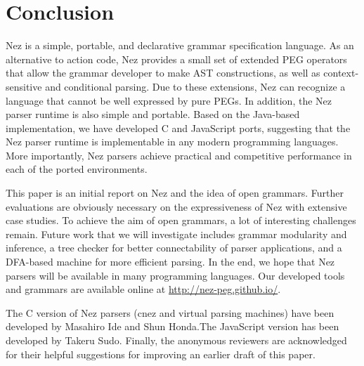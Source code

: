 \documentclass[preprint]{sigplanconf}
\begin{document}
\section{Conclusion} \label{sec:conclusion}

Nez is a simple, portable, and declarative grammar specification language. As an alternative to action code, Nez provides a small set of extended PEG operators that allow the grammar developer to make AST constructions, as well as context-sensitive and conditional parsing. Due to these extensions, Nez can recognize a language that cannot be well expressed by pure PEGs. In addition, the Nez parser runtime is also simple and portable. Based on the Java-based implementation, we have developed C and JavaScript ports, suggesting that the Nez parser runtime is implementable in any modern programming languages. More importantly, Nez parsers achieve practical and competitive performance in each of the ported environments.

This paper is an initial report on Nez and the idea of open grammars. Further evaluations are obviously necessary on the expressiveness of Nez with extensive case studies. To achieve the aim of open grammars, a lot of interesting challenges remain. Future work that we will investigate includes grammar modularity and inference, a tree checker for better connectability of parser applications, and a DFA-based  machine for more efficient parsing. In the end, we hope that Nez parsers will be available in many programming languages. Our developed tools and grammars are available online at \url{http://nez-peg.github.io/}. 
   
\acks
The C version of Nez parsers (cnez and virtual parsing machines) have been developed by Masahiro Ide and Shun Honda.The JavaScript version has been developed by Takeru Sudo. Finally, the anonymous reviewers are acknowledged for their helpful suggestions for improving an earlier draft of this paper.




  
\end{document}
